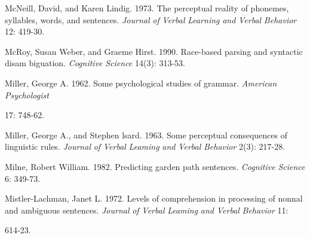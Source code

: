 \begin{styleStandard}
McNeill, David, and Karen Lindig. 1973. The perceptual reality of phonemes, syllables, words, and sentences. \textit{Journal}\textit{ }\textit{of}\textit{ }\textit{Verbal}\textit{ }\textit{Learning}\textit{ }\textit{and}\textit{ }\textit{Verbal}\textit{ }\textit{Behavior}\textit{ }12: 419-30.
\end{styleStandard}


\clearpage\setcounter{page}{1}\begin{styleStandard}
McRoy, Susan Weber, and Graeme Hirst. 1990. Race-based parsing and syntactic disam\- biguation. \textit{Cognitive}\textit{ }\textit{Science}\textit{ }14(3): 313-53.
\end{styleStandard}


\begin{styleStandard}
Miller, George A. 1962. Some psychological studies of grammar. \textit{American}\textit{ }\textit{Psychologist}
\end{styleStandard}


\begin{styleStandard}
17: 748-62.
\end{styleStandard}


\begin{styleStandard}
Miller, George A., and Stephen lsard. 1963. Some perceptual consequences of linguistic rules. \textit{Journal}\textit{ }\textit{of}\textit{ }\textit{Verbal}\textit{ }\textit{Leaming}\textit{ }\textit{and}\textit{ }\textit{Verbal}\textit{ }\textit{Behavior}\textit{ }2(3): 217-28.
\end{styleStandard}


\begin{styleStandard}
Milne, Robert William. 1982. Predicting garden{\textquotesingle} path sentences. \textit{Cognitive}\textit{ }\textit{Science}\textit{ }6: 349-73.
\end{styleStandard}


\begin{styleStandard}
Mistler-Lachman, Janet L. 1972. Levels of comprehension in processing of nonnal and ambiguous sentences. \textit{Journal}\textit{ }\textit{of}\textit{ }\textit{Verbal}\textit{ }\textit{Leaming}\textit{ }\textit{and}\textit{ }\textit{Verbal}\textit{ }\textit{Behavior}\textit{ }11:
\end{styleStandard}


\begin{styleStandard}
614-23.
\end{styleStandard}


